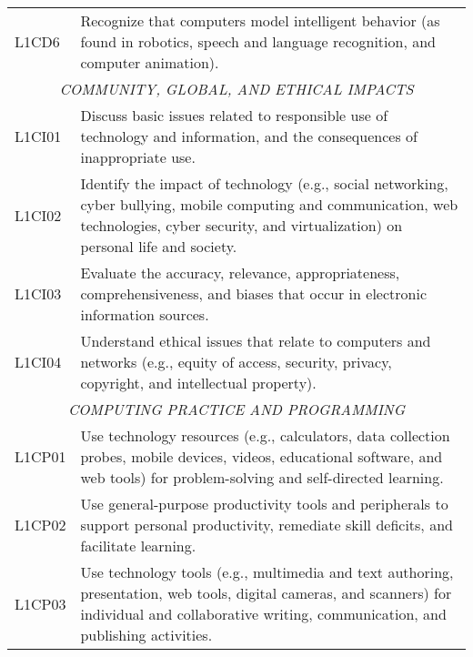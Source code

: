 \begin{longtable}{p{1.8cm}p{11cm}}
 L1CD6   & Recognize that computers model intelligent behavior (as found in robotics, speech and language recognition, and computer animation).                                                                                       \\
 \multicolumn{2}{c}{\textit{COMMUNITY, GLOBAL, AND ETHICAL IMPACTS}}                                                                                                                                                                                \\
 L1CI01  & Discuss basic issues related to responsible use of technology and information, and the consequences of inappropriate use.                                                                                                  \\
 L1CI02  & Identify the impact of technology (e.g., social networking, cyber bullying, mobile computing and communication, web technologies, cyber security, and virtualization) on personal life and society.                        \\
 L1CI03  & Evaluate the accuracy, relevance, appropriateness, comprehensiveness, and biases that occur in electronic information sources.                                                                                             \\
 L1CI04  & Understand ethical issues that relate to computers and networks (e.g., equity of access, security, privacy, copyright, and intellectual property).                                                                         \\
 \multicolumn{2}{c}{\textit{COMPUTING PRACTICE AND PROGRAMMING}}                                                                                                                                                                                         \\
 L1CP01  & Use technology resources (e.g., calculators, data collection probes, mobile devices, videos, educational software, and web tools) for problem-solving and self-directed learning.                                          \\
 L1CP02  & Use general-purpose productivity tools and peripherals to support personal productivity, remediate skill deficits, and facilitate learning.                                                                                \\
 L1CP03  & Use technology tools (e.g., multimedia and text authoring, presentation, web tools, digital cameras, and scanners) for individual and collaborative writing, communication, and publishing activities.                     \\

\end{longtable}
